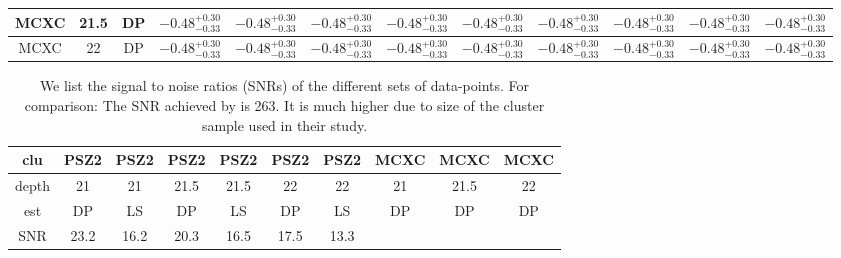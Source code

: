 \documentclass[a4paper,fleqn,usenatbib]{mnras}
\begin{document}
\begin{table}
\begin{tabular}{|c|c|c|c|c|c|c|c|c|c|c|c|}
    \hline
   MCXC & 21.5 & DP & $-0.48^{+0.30}_{-0.33}$ & $-0.48^{+0.30}_{-0.33}$ & $-0.48^{+0.30}_{-0.33}$ & $-0.48^{+0.30}_{-0.33}$ & $-0.48^{+0.30}_{-0.33}$ & $-0.48^{+0.30}_{-0.33}$ & $-0.48^{+0.30}_{-0.33}$ & $-0.48^{+0.30}_{-0.33}$ & $-0.48^{+0.30}_{-0.33}$ \\
    \hline
   MCXC & 22 & DP & $-0.48^{+0.30}_{-0.33}$ & $-0.48^{+0.30}_{-0.33}$ & $-0.48^{+0.30}_{-0.33}$ & $-0.48^{+0.30}_{-0.33}$ & $-0.48^{+0.30}_{-0.33}$ & $-0.48^{+0.30}_{-0.33}$ & $-0.48^{+0.30}_{-0.33}$ & $-0.48^{+0.30}_{-0.33}$ & $-0.48^{+0.30}_{-0.33}$ \\
    \hline
    \end{tabular} 
\end{table}

\begin{table}
    \centering
    \caption{We list the signal to noise ratios (SNRs) of the different sets of data-points. For comparison: The SNR achieved by \citet{more2016detection} is 263. It is much higher due to size of the cluster sample used in their study.}
    \label{tab:snr}
    \begin{tabular}{|c|c|c|c|c|c|c|c|c|c|}
    \hline
    clu & PSZ2 & PSZ2 & PSZ2 & PSZ2 & PSZ2 & PSZ2 & MCXC & MCXC & MCXC\\  
    \hline 
    depth & 21 & 21 & 21.5 & 21.5 & 22 & 22 & 21 & 21.5 & 22\\ 
    \hline
   est & DP & LS & DP & LS & DP & LS & DP & DP & DP\\ 
    \hline 
   SNR & 23.2 & 16.2 & 20.3 & 16.5 & 17.5 & 13.3 & & &\\ 
    \hline
    \end{tabular} 
\end{table}
\end{document}
